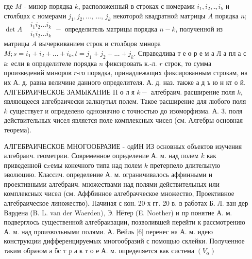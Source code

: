 \documentclass[10pt]{article}
\begin{document}
где $M$ - минор порядка $k$, расположенный в строках с номерами $i_{1}, i_{2}, ., i_{k}$ и столбцах с номерами $j_{1}, j_{2}, \ldots$, ..., $j_{k}$ некоторой квадратной матрицы $A$ порядка $n$; $\operatorname{det} A \begin{aligned} & i_{1} i_{2} \ldots i_{k} \\ & i_{1} i_{2} \ldots i_{k}\end{aligned}-$ определитель матрицы порядка $n-k$, полученной из матрицы $A$ вычеркиванием строк и столбцов минора $M ; s=i_{1}+i_{2}+\ldots+i_{k}, t=j_{1}+j_{2}+\ldots+j_{k}$. Справедлива т е о р е м а Л а пл а с а: если в определителе порядка $n$ фиксировать к.-л. $r$ строк, то сумма произведений миноров $r$-го порядка, принадлежащих фиксированным строкам, на их А. д. равна величине данного определителя. А. д. наз. также а д ъ ю н кт о й. АЛГЕБРАИЧЕСКОЕ ЗАМЫКАНИЕ П о л я $k-$ алгебраич. расширение поля $k$, являющееся алгебраически залкнутыл полем. Такое расширение для любого поля $k$ существует и определено однозначно с точностью до изоморфизма. А. 3. поля действительных чисел является поле комплексных чисел (см. Алгебры основная теорема).



АЛГЕБРАИЧЕСКОЕ МНОГООБРАЗИЕ - одИН ИЗ основных объектов изучения алгебраич. геометрии. Современное определение А. м. над полем $k$ как приведенной $с x е м ы$ конечного типа над полем $k$ претерпело длительную эволюцию. Классич. определение А. м. ограничивалось аффинными и проективными алгебраич. множествами над полями действительных или комплексных чисел (см. Аффбинное алгебрачческое множество, Проективное алгебраическое линожество). Начиная с кон. 20-х гг. 20 в. в работах Б. Л. ван дер Вардена (B. L. van der Waerden), Э. Нётер (E. Noether) и пр понятие А. м. подверглось существенной алгебраизации, позволившей перейти к рассмотрению А. м. над произвольными полями. А. Вейль [6] перенес на А. м. идею конструкции дифференцируемых многообразий с помощью склейки. Полученное таким образом а бс т р а к т о е А. м. определяется как система $\left(V_{\alpha}\right)$
\end{document}
